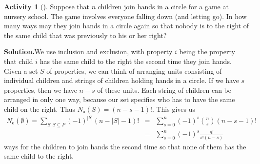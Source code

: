 \documentclass[10pt,]{book}
\theoremstyle{plain}
\theoremstyle{definition}
\newtheorem{activity}[project]{Activity}
\numberwithin{equation}{chapter}
\newcommand{\amp}{&}
\begin{document}
\begin{activity}[]\label{activity-230}
Suppose that \(n\) children join hands in a circle for a game at nursery school. The game involves everyone falling down (and letting go). In how many ways may they join hands in a circle again so that nobody is to the right of the same child that was previously to his or her right?%
\par\medskip\noindent%
\textbf{Solution.}\quad We use inclusion and exclusion, with property \(i\) being the property that child \(i\) has the same child to the right the second time they join hands.  Given a set \(S\) of properties, we can think of arranging units consisting of individual children and strings of children holding hands in a circle. If we have \(s\) properties, then we have \(n-s\) of these units. Each string of children can be arranged in only one way, because our set specifies who has to have the same child on the right. Thus \(N_{\mbox{a} }(S) = (n-s-1)!\). This gives us%
\begin{align*}
N_{\mbox{e} }(\emptyset)=\sum_{S:S\subseteq P}
(-1)^{|S|}(n-|S|-1)!\amp =\amp 
\sum_{s=0}^n (-1)^s \binom{n}{s} (n-s-1)!\\
\amp =\amp \sum_{s=0}^n (-1)^s \frac{n!}{s!(n-s)}
\end{align*}
ways for the children to join hands the second time so that none of them has the same child to the right.%
\end{activity}
\end{document}
